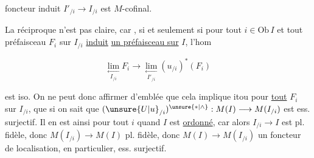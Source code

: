 
  foncteur induit $I'_{/i}\longrightarrow I_{/i}$ est $M$-cofinal.

La réciproque n'est pas claire, car  ,   si et seulement si pour tout $i\in\mathrm{Ob}\,I$ et tout préfaisceau $F_i$ sur $I_{/i}$  \uline{induit}  \uline{ un préfaisceau  sur} $I$, l'hom

\[
\underset{I_{/i}}{\underset{\longleftarrow}{\lim}}F_i\longrightarrow\underset{I'_{/i}}{\underset{\longleftarrow}{\lim}}(u_{/i})^*(F_i)
\]

est iso. On ne peut donc affirmer d'emblée que cela implique itou pour \uline{tout} $F_i$ sur $I_{/i}$, que si on sait que $(\unsure{U|u}_{/i})^{\unsure{*|\wedge}}:M(I)\longrightarrow M(I_{/i})$ est ess. surjectif. Il en est ainsi pour tout $i$ quand $I$ est \uline{ordonné},  car alors $I_{/i}\longrightarrow I$ est pl. fidèle, donc $M(I_{/i})\longrightarrow M(I)$ pl. fidèle, donc $M(I)\longrightarrow M(I_{/i})$ un foncteur de localisation,  en particulier, ess. surjectif.

